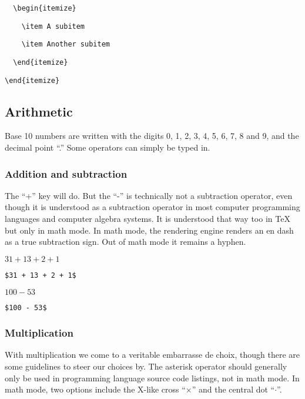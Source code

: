 \verb=  \begin{itemize}=

\verb=    \item A subitem=

\verb=    \item Another subitem=

\verb=  \end{itemize}=

\verb=\end{itemize}=

\subsection{Arithmetic}

Base 10 numbers are written with the digits 0, 1, 2, 3, 4, 5, 6, 7, 8 and 9, and the decimal point ``.'' Some operators can simply be typed in.

\subsubsection{Addition and subtraction}

The ``+'' key will do. But the ``-'' is technically not a subtraction operator, even though it is understood as a subtraction operator in most computer programming languages and computer algebra systems. It is understood that way too in \TeX{} but only in math mode. In math mode, the rendering engine renders an en dash as a true subtraction sign. Out of math mode it remains a hyphen.

\medskip

$31 + 13 + 2 + 1$

\smallskip

\verb=$31 + 13 + 2 + 1$=

\bigskip

$100 - 53$

\smallskip

\verb=$100 - 53$=

\subsubsection{Multiplication}

With multiplication we come to a veritable embarrasse de choix, though there are some guidelines to steer our choices by. The asterisk operator should generally only be used in programming language source code listings, not in math mode. In math mode, two options include the X-like cross ``$\times$'' and the central dot ``$\cdot$''.


